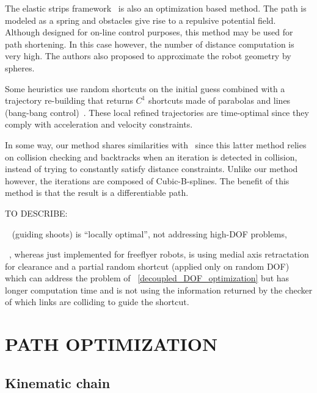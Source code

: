 \documentclass{tADR2e}
\begin{document}
The elastic strips framework~\cite{BrockElasticStrips} is also an optimization 
based method. The path is modeled as a spring and obstacles give rise to a 
repulsive potential field. Although designed for on-line control purposes, this 
method may be used for path shortening. In this case however, the number of 
distance computation is very high. The authors also proposed to approximate the 
robot geometry by spheres.

Some heuristics use random shortcuts on the initial guess combined with a 
trajectory re-building that returns ${C}^1$ shortcuts made of parabolas and lines 
(bang-bang control)~\cite{HauserFastSmooth}. These local refined trajectories 
are time-optimal since they comply with acceleration and velocity constraints. 

In some way, our method shares similarities with~\cite{PanSmoothSplineShort} 
since this latter method relies on collision checking and backtracks when an 
iteration is detected in collision, instead of trying to constantly satisfy 
distance constraints. Unlike our method however, the iterations are composed of 
Cubic-B-splines. The benefit of this method is that the result is a 
differentiable path.

TO DESCRIBE:

~\cite{Guernane2011} (guiding shoots) is ``locally optimal'', not addressing high-DOF problems, 

~\cite{Geraerts04clearancebased}, whereas just implemented for freeflyer robots, is using medial axis retractation for clearance and a partial random shortcut (applied only on random DOF) which can address the problem of ~\ref{decoupled_DOF_optimization} but has longer computation time and is not using the information returned by the checker of which links are colliding to guide the shortcut.


\section{PATH OPTIMIZATION} \label{section:path_optim}

\subsection {Kinematic chain}
\end{document}
